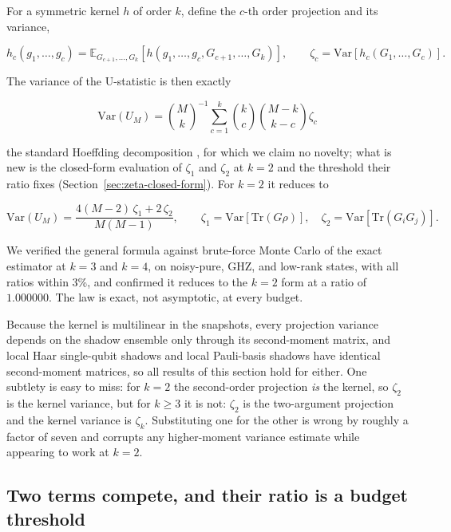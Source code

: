 \documentclass[a4paper,superscriptaddress,nofootinbib,onecolumn,nopdfoutputerror]{quantumarticle}
\begin{document}
For a symmetric kernel \(h\) of order \(k\), define the \(c\)-th order
projection and its variance,

\[h_c(g_1, \ldots, g_c) = \mathbb{E}_{G_{c+1}, \ldots, G_k}\!\left[ h(g_1, \ldots, g_c, G_{c+1}, \ldots, G_k) \right], \qquad \zeta_c = \mathrm{Var}\!\left[ h_c(G_1, \ldots, G_c) \right].\]

The variance of the U-statistic is then exactly

\[\boxed{\;\mathrm{Var}(U_M) = \binom{M}{k}^{-1} \sum_{c=1}^{k} \binom{k}{c} \binom{M-k}{\,k-c\,} \zeta_c \;}\]

the standard Hoeffding decomposition \cite{hoeffding1948, serfling1980},
for which we claim no novelty; what is new is the closed-form evaluation of \(\zeta_1\) and \(\zeta_2\) at \(k = 2\)
and the threshold their ratio fixes
(Section~\ref{sec:zeta-closed-form}). For \(k = 2\) it reduces to

\[\mathrm{Var}(U_M) = \frac{4(M-2)\,\zeta_1 + 2\,\zeta_2}{M(M-1)}, \qquad \zeta_1 = \mathrm{Var}\!\left[\mathrm{Tr}(G\rho)\right], \quad \zeta_2 = \mathrm{Var}\!\left[\mathrm{Tr}(G_i G_j)\right].\]

We verified the general formula against brute-force Monte Carlo of the
exact estimator at \(k = 3\) and \(k = 4\), on noisy-pure, GHZ, and
low-rank states, with all ratios within 3\%, and confirmed it reduces to
the \(k=2\) form at a ratio of \(1.000000\). The law is exact, not
asymptotic, at every budget.

Because the kernel is multilinear in the snapshots, every projection
variance depends on the shadow ensemble only through its second-moment
matrix, and local Haar single-qubit shadows and local Pauli-basis shadows
have identical second-moment matrices, so all results of this section hold
for either. One subtlety is easy to miss: for \(k = 2\) the second-order
projection \emph{is} the kernel, so \(\zeta_2\) is the kernel variance,
but for \(k \geq 3\) it is not: \(\zeta_2\) is the two-argument
projection and the kernel variance is \(\zeta_k\). Substituting one for
the other is wrong by roughly a factor of seven and corrupts any
higher-moment variance estimate while appearing to work at \(k = 2\).

\hypertarget{two-terms-compete-and-their-ratio-is-a-budget-threshold}{%
\subsection{Two terms compete, and their ratio is a budget
threshold}\label{two-terms-compete-and-their-ratio-is-a-budget-threshold}}
\end{document}
